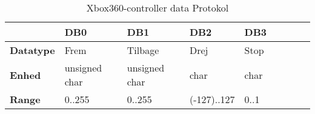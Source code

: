 \begin{table}[ht]
\begin{tabularx}{\textwidth}{| Z | Z | Z | Z | Z | Z | Z | Z | Z |} \hline

\textbf{}	&
\textbf{DB0}	&
\textbf{DB1}	&
\textbf{DB2}	&
\textbf{DB3}	\\ \hline

\textbf{Datatype} & Frem & Tilbage & Drej & Stop \\ \hline
\textbf{Enhed} & unsigned char & unsigned char & char & char\\ \hline
\textbf{Range} & 0..255 & 0..255 & (-127)..127  & 0..1 \\ \hline

\end{tabularx}
\caption{Xbox360-controller data Protokol}
\label{tbl:prt_controller_byte}
\end{table}
